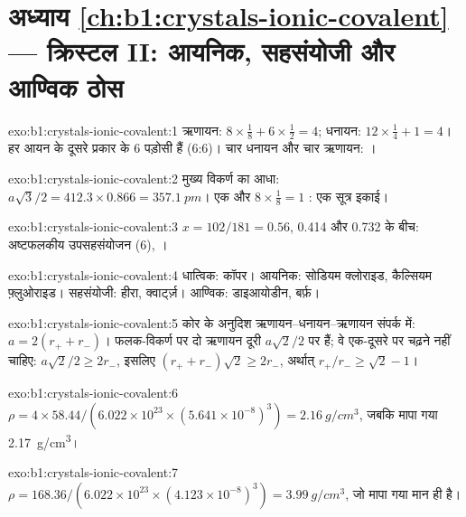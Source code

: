 \section*{अध्याय \ref{ch:b1:crystals-ionic-covalent} --- क्रिस्टल II: आयनिक, सहसंयोजी और आण्विक ठोस}

\begin{solution}{exo:b1:crystals-ionic-covalent:1}
ऋणायन: $8 \times \frac18 + 6 \times \frac12 = 4$; धनायन: $12 \times
\frac14 + 1 = 4$। हर आयन के दूसरे प्रकार के 6 पड़ोसी हैं (6:6)। चार
धनायन और चार ऋणायन: ।
\end{solution}

\begin{solution}{exo:b1:crystals-ionic-covalent:2}
मुख्य विकर्ण का आधा: $a\sqrt3/2 = 412.3 \times 0.866 = \qty{357.1}{pm}$।
एक  और $8 \times \frac18 = 1$ : एक सूत्र इकाई।
\end{solution}

\begin{solution}{exo:b1:crystals-ionic-covalent:3}
$x = 102/181 = 0.56$, 0.414 और 0.732 के बीच: अष्टफलकीय उपसहसंयोजन
(6), ।
\end{solution}

\begin{solution}{exo:b1:crystals-ionic-covalent:4}
धात्विक: कॉपर। आयनिक: सोडियम क्लोराइड, कैल्सियम फ़्लुओराइड। सहसंयोजी:
हीरा, क्वार्ट्ज़। आण्विक: डाइआयोडीन, बर्फ़।
\end{solution}

\begin{solution}{exo:b1:crystals-ionic-covalent:5}
कोर के अनुदिश ऋणायन--धनायन--ऋणायन संपर्क में: $a = 2(r_+ + r_-)$।
फलक-विकर्ण पर दो ऋणायन दूरी $a\sqrt2/2$ पर हैं; वे एक-दूसरे पर
चढ़ने नहीं चाहिए: $a\sqrt2/2 \ge 2r_-$, इसलिए $(r_+ + r_-)\sqrt2 \ge 2r_-$, अर्थात्
$r_+/r_- \ge \sqrt2 - 1$।
\end{solution}

\begin{solution}{exo:b1:crystals-ionic-covalent:6}
$\rho = 4 \times 58.44/(6.022 \times 10^{23} \times (5.641 \times
10^{-8})^3) = \qty{2.16}{g/cm^3}$, जबकि मापा गया \qty{2.17}{g/cm^3}।
\end{solution}

\begin{solution}{exo:b1:crystals-ionic-covalent:7}
$\rho = 168.36/(6.022 \times 10^{23} \times (4.123 \times 10^{-8})^3) =
\qty{3.99}{g/cm^3}$, जो मापा गया मान ही है।
\end{solution}

